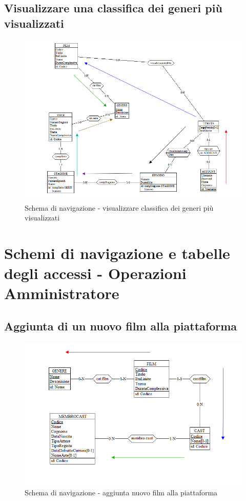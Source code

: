 \documentclass[a4paper,12pt]{report}
\begin{document}
	\subsection{Visualizzare una classifica dei generi più visualizzati}
	\begin{figure}[H]
		\centering
		\includegraphics[width=450pt]{ER/navigazione/classificageneri.png}
		\caption{Schema di navigazione - visualizzare classifica dei generi più visualizzati}
	\end{figure}	
	
	\section{Schemi di navigazione e tabelle degli accessi - Operazioni Amministratore}
	
	\subsection{Aggiunta di un nuovo film alla piattaforma}
	\begin{figure}[H]
		\centering
		\includegraphics[width=450pt]{ER/navigazione/aggiuntafilm.png}
		\caption{Schema di navigazione - aggiunta nuovo film alla piattaforma}
	\end{figure}
	
\end{document}
